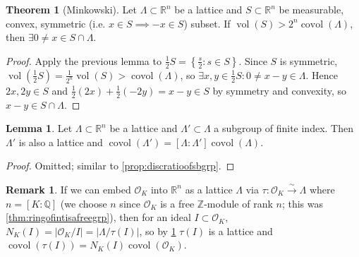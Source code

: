 \documentclass{article}
\newcommand{\Z}{\mathbb{Z}}
\newcommand{\Q}{\mathbb{Q}}
\newcommand{\R}{\mathbb{R}}
\newcommand{\vol}{\operatorname{vol}}
\newcommand{\covol}{\operatorname{covol}}
\newcommand{\ri}{\mathcal{O}}
\theoremstyle{definition}
\newtheorem{thm}[defn]{Theorem}
\newtheorem{lemma}[defn]{Lemma}
\newtheorem{remark}[defn]{Remark}
\begin{document}
\begin{thm}[Minkowski]
\label{thm:Minkowski}
Let $\Lambda\subset\R^n$ be a lattice and $S\subset\R^n$ be measurable, convex, symmetric (i.e. $x\in S\implies -x\in S$) subset. If $\vol(S)>2^n\covol(\Lambda)$, then $\exists 0\neq x\in S\cap\Lambda$.
\end{thm}
\begin{proof}
Apply the previous lemma to $\frac12 S=\left\{\frac{s}{2}:s\in S\right\}$. Since $S$ is symmetric, $\vol\left(\frac12 S\right)=\frac{1}{2^n}\vol(S)>\covol(\Lambda)$, so $\exists x,y\in\frac12 S:0\neq x-y\in\Lambda$. Hence $2x,2y\in S$ and $\frac12(2x)+\frac12(-2y)=x-y\in S$ by symmetry and convexity, so $x-y\in S\cap\Lambda$.
\end{proof}

\begin{lemma}
\label{lemma:covolratioofsbgrp}
Let $\Lambda\subset\R^n$ be a lattice and $\Lambda'\subset\Lambda$ a subgroup of finite index. Then $\Lambda'$ is also a lattice and $\covol(\Lambda')=[\Lambda:\Lambda']\covol(\Lambda)$.
\end{lemma}
\begin{proof}
Omitted; similar to \ref{prop:discratioofsbgrp}.
\end{proof}

\begin{remark}
If we can embed $\ri_K$ into $\R^n$ as a lattice $\Lambda$ via $\tau:\ri_K\xrightarrow{\sim}\Lambda$ where $n=[K:\Q]$ (we choose $n$ since $\ri_K$ is a free $\Z$-module of rank $n$; this was \ref{thm:ringofintisafreegrp}), then for an ideal $I\subset\ri_K$, $N_K(I)=|\ri_K/I|=|\Lambda/\tau(I)|$, so by \ref{lemma:covolratioofsbgrp} $\tau(I)$ is a lattice and $\covol(\tau(I))=N_K(I)\covol(\ri_K)$.
\end{remark}
\end{document}

